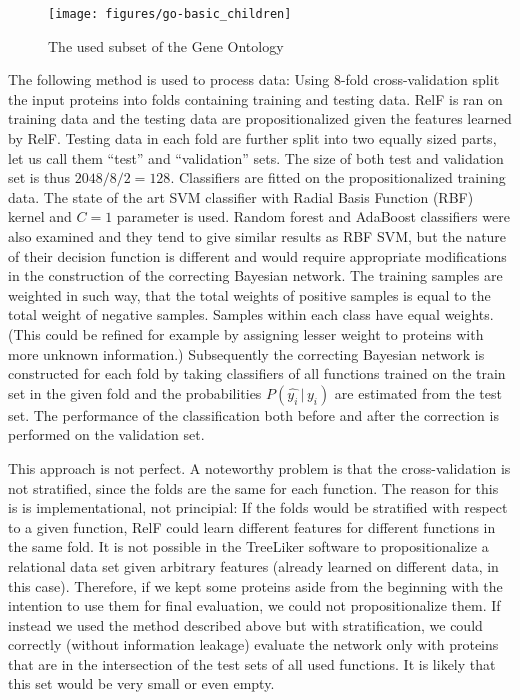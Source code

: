 \documentclass[11pt,twoside,a4paper]{book}
\begin{document}
\begin{landscape}
\begin{figure}[h]
\begin{center}
\texttt{[image: figures/go-basic\_children]}
\caption{The used subset of the Gene Ontology}
\label{fig:go}
\end{center}
\end{figure}
\end{landscape}

The following method is used to process data:
Using 8-fold cross-validation split the input proteins into folds
containing training and testing data.
RelF is ran on training data and the testing 
data are propositionalized given the features learned by RelF.
Testing data in each fold are further split into two equally sized parts,
let us call them ``test'' and ``validation'' sets.
The size of both test and validation set is thus $2048 / 8 / 2 =  128$.
Classifiers are fitted on the propositionalized training data.
The state of the art SVM classifier with Radial Basis Function (RBF)
kernel and $C = 1$ parameter is used.
Random forest and AdaBoost classifiers were also examined 
and they tend to give similar results as RBF SVM,
but the nature of their decision function is different
and would require appropriate modifications in the construction of the 
correcting Bayesian network.
The training samples are weighted in such way, that the total weights
of positive samples is equal to the total weight of negative samples.
Samples within each class have equal weights. 
(This could be refined for example by assigning lesser weight
to proteins with more unknown information.)
Subsequently the correcting Bayesian network is constructed
for each fold by taking classifiers of all functions trained
on the train set in the given fold
and the probabilities $P(\hat{y_i}\,|\,y_i)$ are estimated from the test set.
The performance of the classification both before and after the correction
is performed on the validation set.

This approach is not perfect. 
A noteworthy problem is that the cross-validation is not stratified,
since the folds are the same for each function.
The reason for this is is implementational, not principial:
If the folds would be stratified with respect to a given 
function, RelF could learn different features for different functions
in the same fold.
It is not possible in the TreeLiker software to 
propositionalize a relational data set given arbitrary features
(already learned on different data, in this case).
Therefore, if we kept some proteins aside from the beginning 
with the intention to use them for final evaluation,
we could not propositionalize them.
If instead we used the method described above but with stratification,
we could correctly (without information leakage) evaluate the network only with proteins
that are in the intersection of the test sets of all used functions.
It is likely that this set would be very small or even empty.
\end{document}
